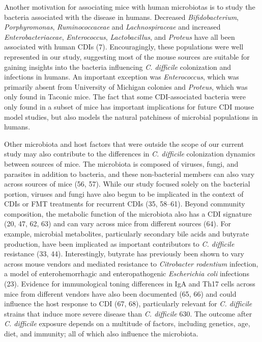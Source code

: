 \documentclass[
  11pt,
]{article}
\begin{document}
Another motivation for associating mice with human microbiotas is to
study the bacteria associated with the disease in humans. Decreased
\emph{Bifidobacterium}, \emph{Porphyromonas}, \emph{Ruminococcaceae} and
\emph{Lachnospiraceae} and increased \emph{Enterobacteriaceae},
\emph{Enterococcus}, \emph{Lactobacillus}, and \emph{Proteus} have all
been associated with human CDIs (7). Encouragingly, these populations
were well represented in our study, suggesting most of the mouse sources
are suitable for gaining insights into the bacteria influencing \emph{C.
difficile} colonization and infections in humans. An important exception
was \emph{Enterococcus}, which was primarily absent from University of
Michigan colonies and \emph{Proteus}, which was only found in Taconic
mice. The fact that some CDI-associated bacteria were only found in a
subset of mice has important implications for future CDI mouse model
studies, but also models the natural patchiness of microbial populations
in humans.

Other microbiota and host factors that were outside the scope of our
current study may also contribute to the differences in \emph{C.
difficile} colonization dynamics between sources of mice. The microbiota
is composed of viruses, fungi, and parasites in addition to bacteria,
and these non-bacterial members can also vary across sources of mice
(56, 57). While our study focused solely on the bacterial portion,
viruses and fungi have also begun to be implicated in the context of
CDIs or FMT treatments for recurrent CDIs (35, 58--61). Beyond community
composition, the metabolic function of the microbiota also has a CDI
signature (20, 47, 62, 63) and can vary across mice from different
sources (64). For example, microbial metabolites, particularly secondary
bile acids and butyrate production, have been implicated as important
contributors to \emph{C. difficile} resistance (33, 44). Interestingly,
butyrate has previously been shown to vary across mouse vendors and
mediated resistance to \emph{Citrobacter rodentium} infection, a model
of enterohemorrhagic and enteropathogenic \emph{Escherichia coli}
infections (23). Evidence for immunological toning differences in IgA
and Th17 cells across mice from different vendors have also been
documented (65, 66) and could influence the host response to CDI (67,
68), particularly relevant for \emph{C. difficile} strains that induce
more severe disease than \emph{C. difficile} 630. The outcome after
\emph{C. difficile} exposure depends on a multitude of factors,
including genetics, age, diet, and immunity; all of which also influence
the microbiota.
\end{document}
